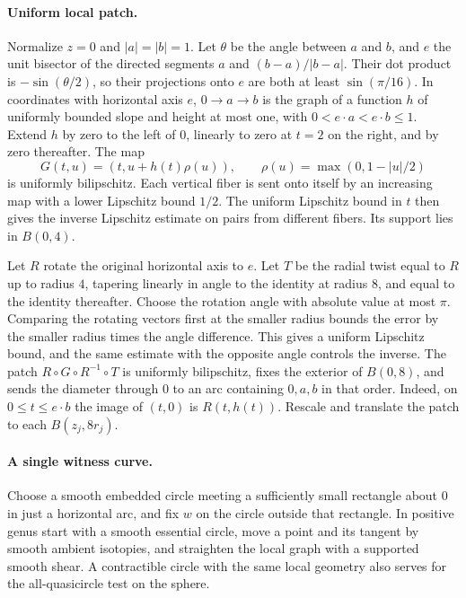 \documentclass[11pt]{amsart}
\begin{document}
\paragraph{Uniform local patch.}
Normalize \(z=0\) and \( |a|=|b|=1\). Let \(\theta\) be the angle
between \(a\) and \(b\), and \(e\) the unit bisector of the directed
segments \(a\) and \((b-a)/|b-a|\). Their dot product is
\(-\sin(\theta/2)\), so their projections onto \(e\) are both
at least \(\sin(\pi/16)\). In coordinates with horizontal axis \(e\),
\(0\to a\to b\) is the graph of a function \(h\) of uniformly
bounded slope and height at most one, with
\(0<e\cdot a<e\cdot b\le1\). Extend \(h\) by zero to the left of \(0\),
linearly to zero at \(t=2\) on the right, and by zero thereafter.
The map
\[
 G(t,u)=(t,u+h(t)\rho(u)),\qquad
 \rho(u)=\max(0,1-|u|/2)
\]
is uniformly bilipschitz. Each vertical fiber is sent onto itself
by an increasing map with a lower Lipschitz bound \(1/2\).
The uniform Lipschitz bound in \(t\) then gives the inverse
Lipschitz estimate on pairs from different fibers. Its support
lies in \(B(0,4)\).

Let \(R\) rotate the original horizontal axis to \(e\). Let \(T\)
be the radial twist equal to \(R\) up to radius \(4\), tapering
linearly in angle to the identity at radius \(8\), and equal to
the identity thereafter. Choose the rotation angle with absolute
value at most \(\pi\). Comparing the rotating vectors first at
the smaller radius bounds the error by the smaller radius times
the angle difference. This gives a uniform Lipschitz bound, and
the same estimate with the opposite angle controls the inverse.
The patch \(R\circ G\circ R^{-1}\circ T\) is uniformly bilipschitz,
fixes the exterior of \(B(0,8)\), and sends the diameter through
\(0\) to an arc containing \(0,a,b\) in that order. Indeed, on
\(0\le t\le e\cdot b\) the image of \((t,0)\) is \(R(t,h(t))\).
Rescale and translate the patch to each \(B(z_j,8r_j)\).

\paragraph{A single witness curve.}
Choose a smooth embedded circle meeting a sufficiently small
rectangle about \(0\) in just a horizontal arc, and fix \(w\) on
the circle outside that rectangle. In positive genus start with
a smooth essential circle, move a point and its tangent by
smooth ambient isotopies, and straighten the local graph with
a supported smooth shear. A contractible circle with the same
local geometry also serves for the all-quasicircle test on the
sphere.
\end{document}
